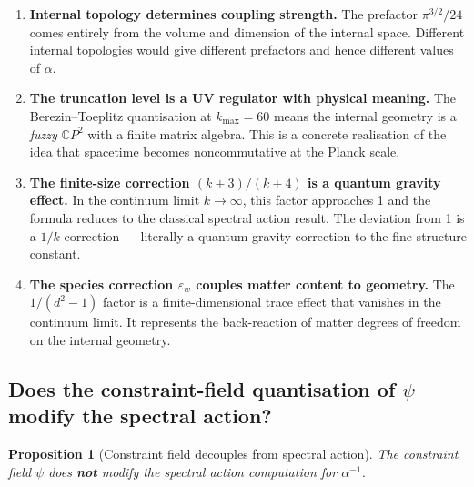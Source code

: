 \documentclass[11pt,a4paper]{article}
\newtheorem{proposition}{Proposition}
\newcommand{\CP}{\mathbb{C}P}
\begin{document}
\begin{enumerate}
\item \textbf{Internal topology determines coupling strength.} The prefactor $\pi^{3/2}/24$ comes entirely from the volume and dimension of the internal space. Different internal topologies would give different prefactors and hence different values of $\alpha$.

\item \textbf{The truncation level is a UV regulator with physical meaning.} The Berezin--Toeplitz quantisation at $k_{\max} = 60$ means the internal geometry is a \emph{fuzzy} $\CP^2$ with a finite matrix algebra. This is a concrete realisation of the idea that spacetime becomes noncommutative at the Planck scale.

\item \textbf{The finite-size correction $(k+3)/(k+4)$ is a quantum gravity effect.} In the continuum limit $k \to \infty$, this factor approaches 1 and the formula reduces to the classical spectral action result. The deviation from 1 is a $1/k$ correction --- literally a quantum gravity correction to the fine structure constant.

\item \textbf{The species correction $\varepsilon_w$ couples matter content to geometry.} The $1/(d^2 - 1)$ factor is a finite-dimensional trace effect that vanishes in the continuum limit. It represents the back-reaction of matter degrees of freedom on the internal geometry.
\end{enumerate}

\subsection{Does the constraint-field quantisation of $\psi$ modify the spectral action?}

\begin{proposition}[Constraint field decouples from spectral action]
\label{prop:psi-spectral}
The constraint field $\psi$ does \textbf{not} modify the spectral action computation for $\alpha^{-1}$.
\end{proposition}
\end{document}
